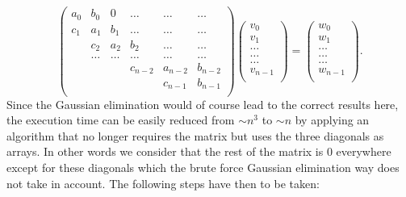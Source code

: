 \documentclass[11pt,a4wide]{article}
\begin{document}
\begin{equation}
    \left(\begin{array}{cccccc}
                           a_0& b_0 & 0 &\dots   & \dots &\dots \\
                           c_1 & a_1 & b_1 &\dots &\dots &\dots \\
                           & c_2 & a_2 & b_2 & \dots & \dots \\
                           & \dots   & \dots &\dots   &\dots & \dots \\
                           &   &  &c_{n-2}  &a_{n-2}& b_{n-2} \\
                           &    &  &   &c_{n-1} & b_ {n-1}\\
                      \end{array} \right)\left(\begin{array}{c}
                           v_0\\
                           v_1\\
                           \dots \\
                          \dots  \\
                          \dots \\
                           v_{n-1}\\
                      \end{array} \right)
  =\left(\begin{array}{c}
                           w_0\\
                           w_1\\
                           \dots \\
                           \dots \\
                          \dots \\
                           w_{n-1}\\
                      \end{array} \right).
											\label{M}
\end{equation}
Since the Gaussian elimination would of course lead to the correct results here, the execution time can be easily reduced from $\sim n^3$ to $\sim n$ by applying an algorithm that no longer requires the matrix but uses the three diagonals as arrays. In other words we consider that the rest of the matrix is 0 everywhere except for these diagonals which the brute force Gaussian elimination way does not take in account. The following steps have then to be taken:
\end{document}
